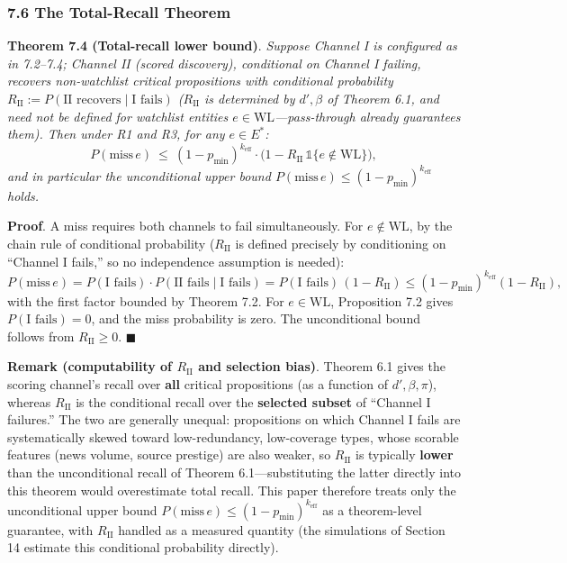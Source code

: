 \documentclass[
  11pt]{article}
\begin{document}
\subsubsection{7.6 The Total-Recall
Theorem}\label{the-total-recall-theorem}

\textbf{Theorem 7.4 (Total-recall lower bound)}. \emph{Suppose Channel I
is configured as in 7.2--7.4; Channel II (scored discovery), conditional
on Channel I failing, recovers non-watchlist critical propositions with
conditional probability
\(R_{\mathrm{II}} := P(\text{II recovers} \mid \text{I fails})\)
(\(R_{\mathrm{II}}\) is determined by \(d', \beta\) of Theorem 6.1, and
need not be defined for watchlist entities
\(e \in \mathrm{WL}\)---pass-through already guarantees them). Then
under R1 and R3, for any \(e \in E^*\):}
\[P(\mathrm{miss}\, e) \ \le\ (1-p_{\min})^{k_{\mathrm{eff}}} \cdot \big(1 - R_{\mathrm{II}}\,\mathbb{1}\{e \notin \mathrm{WL}\}\big),\]
\emph{and in particular the unconditional upper bound
\(P(\mathrm{miss}\, e) \le (1-p_{\min})^{k_{\mathrm{eff}}}\) holds.}

\textbf{Proof}. A miss requires both channels to fail simultaneously.
For \(e \notin \mathrm{WL}\), by the chain rule of conditional
probability (\(R_{\mathrm{II}}\) is defined precisely by conditioning on
``Channel I fails,'' so no independence assumption is needed):
\[P(\mathrm{miss}\, e) = P(\text{I fails})\cdot P(\text{II fails} \mid \text{I fails}) = P(\text{I fails})\,(1 - R_{\mathrm{II}}) \le (1-p_{\min})^{k_{\mathrm{eff}}}(1 - R_{\mathrm{II}}),\]
with the first factor bounded by Theorem 7.2. For \(e \in \mathrm{WL}\),
Proposition 7.2 gives \(P(\text{I fails}) = 0\), and the miss
probability is zero. The unconditional bound follows from
\(R_{\mathrm{II}} \ge 0\). \(\blacksquare\)

\textbf{Remark (computability of \(R_{\mathrm{II}}\) and selection
bias)}. Theorem 6.1 gives the scoring channel's recall over \textbf{all}
critical propositions (as a function of \(d', \beta, \pi\)), whereas
\(R_{\mathrm{II}}\) is the conditional recall over the \textbf{selected
subset} of ``Channel I failures.'' The two are generally unequal:
propositions on which Channel I fails are systematically skewed toward
low-redundancy, low-coverage types, whose scorable features (news
volume, source prestige) are also weaker, so \(R_{\mathrm{II}}\) is
typically \textbf{lower} than the unconditional recall of Theorem
6.1---substituting the latter directly into this theorem would
overestimate total recall. This paper therefore treats only the
unconditional upper bound
\(P(\mathrm{miss}\,e) \le (1-p_{\min})^{k_{\mathrm{eff}}}\) as a
theorem-level guarantee, with \(R_{\mathrm{II}}\) handled as a measured
quantity (the simulations of Section 14 estimate this conditional
probability directly).
\end{document}
